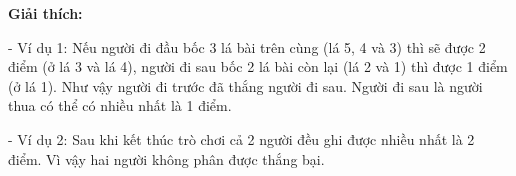 \textbf{    Giải thích:   }

   - Ví dụ 1: Nếu người đi đầu bốc 3 lá bài trên cùng (lá 5, 4 và 3) thì sẽ được 2 điểm (ở lá 3 và lá 4), người đi sau bốc 2 lá bài còn lại (lá 2 và 1) thì được 1 điểm (ở lá 1). Như vậy người đi trước đã thắng người đi sau. Người đi sau là người thua có thể có nhiều nhất là 1 điểm.  

   - Ví dụ 2: Sau khi kết thúc trò chơi cả 2 người đều ghi được nhiều nhất là 2 điểm. Vì vậy hai người không phân được thắng bại.  
